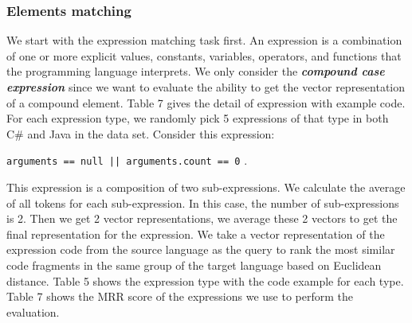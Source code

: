 \subsubsection{Elements matching}
We start with the expression matching task first. An expression is a combination of one or more explicit values, constants, variables, operators, and functions that the programming language interprets.
We only consider the \textbf{\textit{compound case expression}} since we want to evaluate the ability to get the vector representation of a compound element. Table 7 gives the detail of expression with example code. For each expression type, we randomly pick 5 expressions of that type in both C\# and Java in the data set. Consider this expression:

\texttt{arguments == null || arguments.count == 0} . 

This expression is a composition of two sub-expressions. We calculate the average of all tokens for each sub-expression. In this case, the number of sub-expressions is 2. Then we get 2 vector representations, we average these 2 vectors to get the final representation for the expression. We take a vector representation of the expression code from the source language as the query to rank the most similar code fragments in the same group of the target language based on Euclidean distance. Table 5 shows the expression type with the code example for each type. Table 7 shows the MRR score of the expressions we use to perform the evaluation.

\begin{table}
	
	\label{tab:freq}
	\caption{Expression types with code example}	
\end{table}


